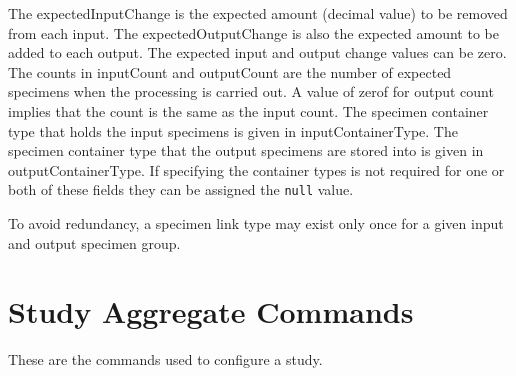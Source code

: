 The expectedInputChange is the expected amount (decimal value) to be removed
from each input. The expectedOutputChange is also the expected amount to be
added to each output. The expected input and output change values can be zero.
The counts in inputCount and outputCount are the number of expected specimens
when the processing is carried out. A value of zerof for output count implies
that the count is the same as the input count. The specimen container type that
holds the input specimens is given in inputContainerType. The specimen
container type that the output specimens are stored into is given in
outputContainerType. If specifying the container types is not required for one
or both of these fields they can be assigned the \texttt{null} value.

To avoid redundancy, a specimen link type may exist only once for a given input
and output specimen group.

\section {Study Aggregate Commands}
These are the commands used to configure a study.

